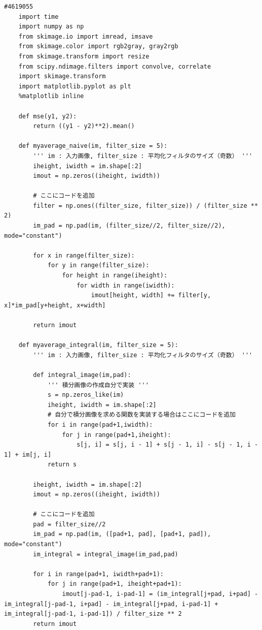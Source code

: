\documentclass[12pt]{jarticle}
\begin{document}
\begin{lstlisting}[style = py,caption=kadai1]
    #4619055
    import time
    import numpy as np
    from skimage.io import imread, imsave
    from skimage.color import rgb2gray, gray2rgb
    from skimage.transform import resize
    from scipy.ndimage.filters import convolve, correlate
    import skimage.transform
    import matplotlib.pyplot as plt
    %matplotlib inline
    
    def mse(y1, y2):
        return ((y1 - y2)**2).mean()
    
    def myaverage_naive(im, filter_size = 5):
        ''' im : 入力画像, filter_size : 平均化フィルタのサイズ（奇数） '''
        iheight, iwidth = im.shape[:2]
        imout = np.zeros((iheight, iwidth))
        
        # ここにコードを追加
        filter = np.ones((filter_size, filter_size)) / (filter_size ** 2)
        im_pad = np.pad(im, (filter_size//2, filter_size//2), mode="constant")
        
        for x in range(filter_size):
            for y in range(filter_size):
                for height in range(iheight):
                    for width in range(iwidth):
                        imout[height, width] += filter[y, x]*im_pad[y+height, x+width]
        
        return imout
    
    def myaverage_integral(im, filter_size = 5):
        ''' im : 入力画像, filter_size : 平均化フィルタのサイズ（奇数） '''
            
        def integral_image(im,pad):
            ''' 積分画像の作成自分で実装 '''
            s = np.zeros_like(im)
            iheight, iwidth = im.shape[:2]
            # 自分で積分画像を求める関数を実装する場合はここにコードを追加
            for i in range(pad+1,iwidth):
                for j in range(pad+1,iheight):
                    s[j, i] = s[j, i - 1] + s[j - 1, i] - s[j - 1, i - 1] + im[j, i]
            return s
        
        iheight, iwidth = im.shape[:2]
        imout = np.zeros((iheight, iwidth))
    
        # ここにコードを追加
        pad = filter_size//2
        im_pad = np.pad(im, ([pad+1, pad], [pad+1, pad]), mode="constant") 
        im_integral = integral_image(im_pad,pad)
        
        for i in range(pad+1, iwidth+pad+1):
            for j in range(pad+1, iheight+pad+1): 
                imout[j-pad-1, i-pad-1] = (im_integral[j+pad, i+pad] - im_integral[j-pad-1, i+pad] - im_integral[j+pad, i-pad-1] + im_integral[j-pad-1, i-pad-1]) / filter_size ** 2
        return imout
    

\end{lstlisting}
\end{document}
